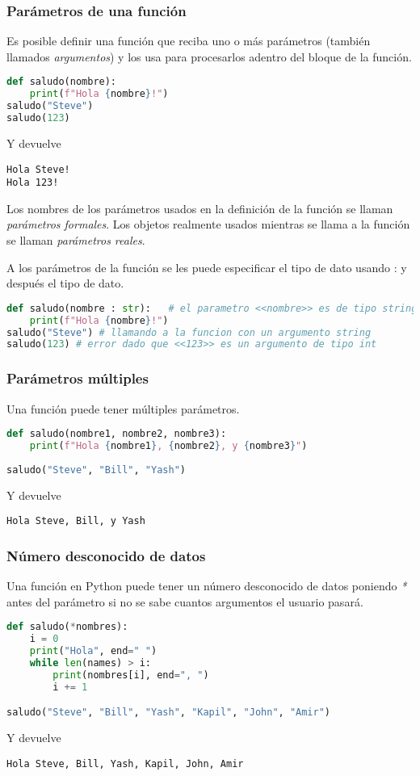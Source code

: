 	\subsubsection{Parámetros de una función}
	Es posible definir una función que reciba uno o más parámetros (también llamados \emph{argumentos}) y los usa para procesarlos adentro del bloque de la función. 
	\begin{lstlisting}[language = {python}]
def saludo(nombre):
    print(f"Hola {nombre}!")
saludo("Steve")
saludo(123)
	\end{lstlisting}
	Y devuelve
	\begin{lstlisting}[language = {[latex]tex}]
Hola Steve!
Hola 123!
	\end{lstlisting}
	Los nombres de los parámetros usados en la definición de la función se llaman \emph{parámetros formales}. Los objetos realmente usados mientras se llama a la función se llaman \emph{parámetros reales}.\par 
	A los parámetros de la función se les puede especificar el tipo de dato usando : y después el tipo de dato.
	\begin{lstlisting}[language = {python}]
def saludo(nombre : str):   # el parametro <<nombre>> es de tipo string
    print(f"Hola {nombre}!")
saludo("Steve") # llamando a la funcion con un argumento string
saludo(123) # error dado que <<123>> es un argumento de tipo int
	\end{lstlisting}
	\subsubsection{Parámetros múltiples}
	Una función puede tener múltiples parámetros.
	\begin{lstlisting}[language = {python}]
def saludo(nombre1, nombre2, nombre3):
    print(f"Hola {nombre1}, {nombre2}, y {nombre3}")
    
saludo("Steve", "Bill", "Yash")
	\end{lstlisting}
	Y devuelve
	\begin{lstlisting}[language = {[latex]tex}]
Hola Steve, Bill, y Yash
	\end{lstlisting}
	\subsubsection{Número desconocido de datos}
	Una función en Python puede tener un número desconocido de datos poniendo \emph{*} antes del parámetro si no se sabe cuantos argumentos el usuario pasará.
	\begin{lstlisting}[language = {python}]
def saludo(*nombres):
    i = 0
    print("Hola", end=" ")
    while len(names) > i:
        print(nombres[i], end=", ")
        i += 1

saludo("Steve", "Bill", "Yash", "Kapil", "John", "Amir")
	\end{lstlisting}
	Y devuelve
	\begin{lstlisting}[language = {[latex]tex}]
Hola Steve, Bill, Yash, Kapil, John, Amir
	\end{lstlisting}
